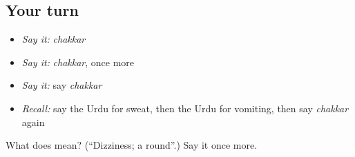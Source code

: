 \subsection*{Your turn}
\begin{itemize}
\raggedright
  \item \emph{Say it:} \emph{chakkar}
  \item \emph{Say it:} \emph{chakkar}, once more
  \item \emph{Say it:} say \emph{chakkar}
  \item \emph{Recall:} say the Urdu for sweat, then the Urdu for vomiting, then say \emph{chakkar} again
\end{itemize}

\begin{tcolorbox}[breakable,colback=teal!4,colframe=teal!35!black,title={Before you move on}]
What does  mean? (\textquotedblleft{}Dizziness; a round\textquotedblright{}.) Say it once more.
\end{tcolorbox}
